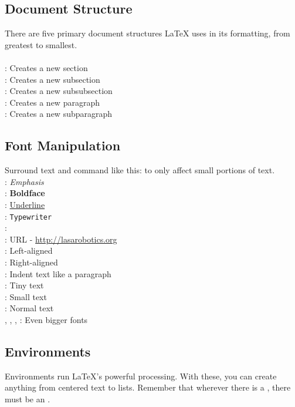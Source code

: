 \subsection{Document Structure}
There are five primary document structures LaTeX uses in its formatting, from greatest to smallest.\\\\
: Creates a new section\\
: Creates a new subsection\\
: Creates a new subsubsection\\
: Creates a new paragraph\\
: Creates a new subparagraph
\subsection{Font Manipulation}
Surround text and command like this:  to only affect small portions of text.\\
: \emph{Emphasis}\\
: \textbf{Boldface}\\
: \underline{Underline}\\
: \texttt{Typewriter}\\
: \\
: URL - \url{http://lasarobotics.org}\\
: Left-aligned\\
: Right-aligned\\
: Indent text like a paragraph\\
: {\tiny Tiny text}\\
: {\small Small text}\\
: {\normalsize Normal text}\\
, , , : Even bigger fonts

\subsection{Environments}
Environments run \LaTeX{}'s powerful processing.  With these, you can create anything from centered text to lists.  Remember that wherever there is a , there must be an .

